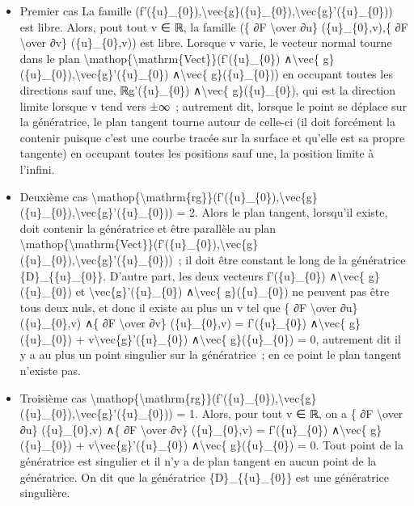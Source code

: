 \documentclass[]{article}
\begin{document}
\begin{itemize}
\itemsep1pt\parskip0pt
\item
  Premier cas La famille
  (f'(\{u\}\_\{0\}),\textbackslash{}vec\{g\}(\{u\}\_\{0\}),\textbackslash{}vec\{g\}'(\{u\}\_\{0\}))
  est libre. Alors, pout tout v ∈ ℝ, la famille (\{ ∂F
  \textbackslash{}over ∂u\} (\{u\}\_\{0\},v),\{ ∂F \textbackslash{}over
  ∂v\} (\{u\}\_\{0\},v)) est libre. Lorsque v varie, le vecteur normal
  tourne dans le plan
  \textbackslash{}mathop\{\textbackslash{}mathrm\{Vect\}\}(f'(\{u\}\_\{0\})
  ∧\textbackslash{}vec\{
  g\}(\{u\}\_\{0\}),\textbackslash{}vec\{g\}'(\{u\}\_\{0\})
  ∧\textbackslash{}vec\{ g\}(\{u\}\_\{0\})) en occupant toutes les
  directions sauf une, ℝg'(\{u\}\_\{0\}) ∧\textbackslash{}vec\{
  g\}(\{u\}\_\{0\}), qui est la direction limite lorsque v tend vers
  ±∞~; autrement dit, lorsque le point se déplace sur la génératrice, le
  plan tangent tourne autour de celle-ci (il doit forcément la contenir
  puisque c'est une courbe tracée sur la surface et qu'elle est sa
  propre tangente) en occupant toutes les positions sauf une, la
  position limite à l'infini.
\item
  Deuxième cas
  \textbackslash{}mathop\{\textbackslash{}mathrm\{rg\}\}(f'(\{u\}\_\{0\}),\textbackslash{}vec\{g\}(\{u\}\_\{0\}),\textbackslash{}vec\{g\}'(\{u\}\_\{0\}))
  = 2. Alors le plan tangent, lorsqu'il existe, doit contenir la
  génératrice et être parallèle au plan
  \textbackslash{}mathop\{\textbackslash{}mathrm\{Vect\}\}(f'(\{u\}\_\{0\}),\textbackslash{}vec\{g\}(\{u\}\_\{0\}),\textbackslash{}vec\{g\}'(\{u\}\_\{0\}))~;
  il doit être constant le long de la génératrice
  \{D\}\_\{\{u\}\_\{0\}\}. D'autre part, les deux vecteurs
  f'(\{u\}\_\{0\}) ∧\textbackslash{}vec\{ g\}(\{u\}\_\{0\}) et
  \textbackslash{}vec\{g\}'(\{u\}\_\{0\}) ∧\textbackslash{}vec\{
  g\}(\{u\}\_\{0\}) ne peuvent pas être tous deux nuls, et donc il
  existe au plus un v tel que \{ ∂F \textbackslash{}over ∂u\}
  (\{u\}\_\{0\},v) ∧\{ ∂F \textbackslash{}over ∂v\} (\{u\}\_\{0\},v) =
  f'(\{u\}\_\{0\}) ∧\textbackslash{}vec\{ g\}(\{u\}\_\{0\}) +
  v\textbackslash{}vec\{g\}'(\{u\}\_\{0\}) ∧\textbackslash{}vec\{
  g\}(\{u\}\_\{0\}) = 0, autrement dit il y a au plus un point singulier
  sur la génératrice~; en ce point le plan tangent n'existe pas.
\item
  Troisième cas
  \textbackslash{}mathop\{\textbackslash{}mathrm\{rg\}\}(f'(\{u\}\_\{0\}),\textbackslash{}vec\{g\}(\{u\}\_\{0\}),\textbackslash{}vec\{g\}'(\{u\}\_\{0\}))
  = 1. Alors, pour tout v ∈ ℝ, on a \{ ∂F \textbackslash{}over ∂u\}
  (\{u\}\_\{0\},v) ∧\{ ∂F \textbackslash{}over ∂v\} (\{u\}\_\{0\},v) =
  f'(\{u\}\_\{0\}) ∧\textbackslash{}vec\{ g\}(\{u\}\_\{0\}) +
  v\textbackslash{}vec\{g\}'(\{u\}\_\{0\}) ∧\textbackslash{}vec\{
  g\}(\{u\}\_\{0\}) = 0. Tout point de la génératrice est singulier et
  il n'y a de plan tangent en aucun point de la génératrice. On dit que
  la génératrice \{D\}\_\{\{u\}\_\{0\}\} est une génératrice singulière.
\end{itemize}
\end{document}
